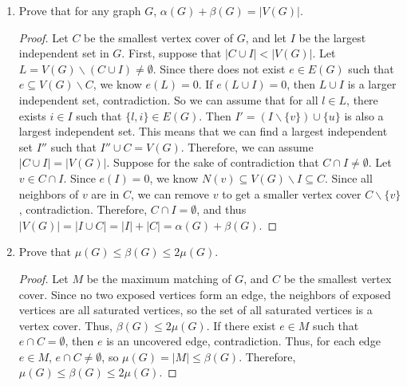 \documentclass{article}
\begin{document}
\begin{enumerate}[label=(\alph*)]
    \item Prove that for any graph $G$, $\alpha(G) + \beta(G) = |V(G)|$.

    \begin{proof}
        Let $C$ be the smallest vertex cover of $G$, and let $I$ be the largest independent set in $G$. First, suppose that $|C \cup I| < |V(G)|$. Let $L = V(G) \backslash (C \cup I) \neq \emptyset$. Since there does not exist $e \in E(G)$ such that $e \subseteq V(G) \backslash C$, we know $e(L) = 0$. If $e(L \cup I) = 0$, then $L \cup I$ is a larger independent set, contradiction. So we can assume that for all $l \in L$, there exists $i \in I$ such that $\{l, i\} \in E(G)$. Then $I' = (I \backslash \{v\}) \cup \{u\}$ is also a largest independent set. This means that 
        we can find a largest independent set $I''$ such that $I'' \cup C = V(G)$. Therefore, we can assume $|C \cup I| = |V(G)|$. Suppose for the sake of contradiction that $C \cap I \neq \emptyset$. Let $v \in C \cap I$. Since $e(I) = 0$, we know $N(v) \subseteq V(G) \backslash I \subseteq C$. Since all neighbors of $v$ are in $C$, we can remove $v$ to get a smaller vertex cover $C \backslash \{v\}$, contradiction. Therefore, $C \cap I = \emptyset$, and thus $|V(G)| = |I \cup C| = |I| + |C| = \alpha(G) + \beta(G)$.
    \end{proof}

    \item  Prove that $\mu(G) \leq \beta(G) \leq 2\mu(G)$.
    
    \begin{proof}
        Let $M$ be the maximum matching of $G$, and $C$ be the smallest vertex cover. Since no two exposed vertices form an edge, the neighbors of exposed vertices are all saturated vertices, so the set of all saturated vertices is a vertex cover. Thus, $\beta(G) \leq 2\mu(G)$. If there exist $e \in M$ such that $e \cap C = \emptyset$, then $e$ is an uncovered edge, contradiction. Thus, for each edge $e \in M$, $e \cap C \neq \emptyset$, so $\mu(G) = |M| \leq \beta(G)$. Therefore, $\mu(G) \leq \beta(G) \leq 2\mu(G)$.
    \end{proof}
\end{enumerate}

\newpage
\end{document}
